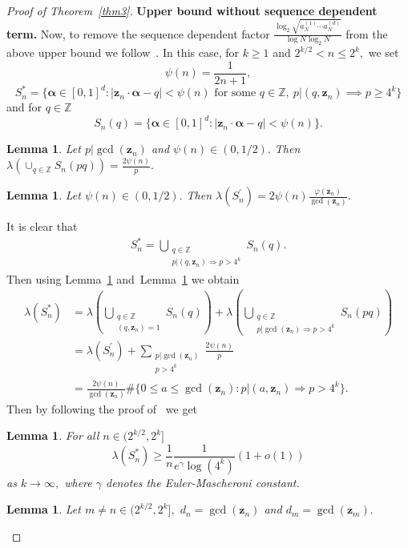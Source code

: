 \documentclass[12pt,article]{amsart}
\newtheorem{lemma}[theorem]{Lemma}
\theoremstyle{remark}
\numberwithin{equation}{section}
\renewcommand{\phi}{\varphi}
\newcommand{\Z}{\mathbb{Z}}
\newcommand{\boldz}{\boldsymbol{z}}
\newcommand{\boldalpha}{\boldsymbol{\alpha}}
\begin{document}
\begin{proof}[Proof of Theorem~\ref{thm3}]
		\textbf{Upper bound without sequence dependent term.}
		Now, to remove the sequence dependent factor $\frac{\log_2\sqrt{a_N^{(1)}\cdots a_N^{(d)}}}{\log N\log_2 N}$ from the above upper bound we follow~\cite{Aistleitner2021minimalgap}. 
		In this case, for $k\geq1$ and $2^{k/2}<n\leq 2^k,$ we set
		\[\psi(n)=\frac{1}{2n+1},\]
		\[S^*_n=\{\boldalpha\in[0,1]^d:|\boldz_n\cdot\boldalpha-q|<\psi(n) \text{ for some } q\in\Z,\:p|(q,\boldz_n)\implies p\geq 4^k\}\]
		and for $q\in\Z$
		\[S_n(q)=\{\boldalpha\in[0,1]^d:|\boldz_n\cdot\boldalpha-q|<\psi(n)\}.\]
		
		\begin{lemma}\cite[Lemma 6]{victor-samju2009}\label{lemma}
			Let $p|\gcd(\boldz_n)$ and $\psi(n)\in(0,1/2).$ Then  $\lambda(\cup_{q\in\Z}S_n(pq))=\frac{2\psi(n)}{p}.$
		\end{lemma}
		\begin{lemma}\cite[Lemma 8]{victor-samju2009}\label{lemma2}
			Let $\psi(n)\in(0,1/2).$ Then  $\lambda(S^{'}_n)=2\psi(n)\frac{\phi(\boldz_n)}{\gcd(\boldz_n)}.$
		\end{lemma}
		It is clear that 
		\begin{align*}
			S^*_n=\bigcup_{\substack{q\in\Z\\p|(q,\boldz_n)\Rightarrow p>4^k}}S_n(q).
		\end{align*}
		Then using Lemma~\ref{lemma} and~Lemma~\ref{lemma2} we obtain
		\begin{align*}
			\lambda(S^*_n)&=\lambda(\bigcup_{\substack{q\in\Z\\(q,\boldz_n)=1}}S_n(q))+\lambda(\bigcup_{\substack{q\in\Z\\p|\gcd(\boldz_n)\Rightarrow p>4^k}}S_n(pq))\\
			&=\lambda(S^{'}_n)+\sum_{\substack{p|\gcd(\boldz_n)\\p>4^k}}\frac{2\psi(n)}{p}\\
			&=\frac{2\psi(n)}{\gcd(\boldz_n)}\#\{0\leq a\leq \gcd(\boldz_n): p|(a,\boldz_n)\Rightarrow p>4^k\}.
		\end{align*}
		Then by following the proof of~\cite[Lemma 2]{Aistleitner2021minimalgap} we get
		\begin{lemma}\label{lower bound of S*_n}
			For all $n\in(2^{k/2},2^k]$ 
			\[\lambda(S^{*}_n)\geq\frac{1}{n}\frac{1}{e^\gamma\log(4^k)}(1+o(1))\]
			as $k\to \infty,$ where $\gamma$ denotes the Euler-Mascheroni constant.
		\end{lemma}
		\begin{lemma}\label{lemma3}
			Let $m\neq n\in(2^{k/2},2^k],$ $d_n=\gcd(\boldz_n)$ and $d_m=\gcd(\boldz_m).$ \\

\end{lemma}
\end{proof}
\end{document}

